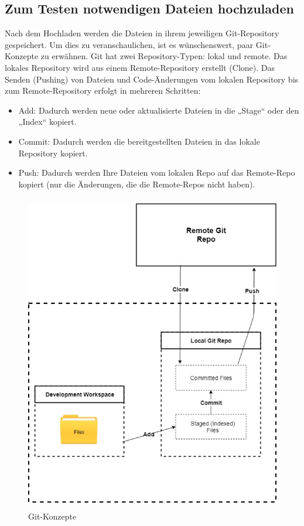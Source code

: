 \documentclass[a4paper,12pt,oneside]{book}
\begin{document}
\subsection{Zum Testen notwendigen Dateien hochzuladen}
Nach dem Hochladen werden die Dateien in ihrem jeweiligen Git-Repository gespeichert. Um dies zu veranschaulichen, ist es wünschenswert, paar Git-Konzepte zu erwähnen.
\newline
Git hat zwei Repository-Typen: lokal und remote. Das lokales Repository wird aus einem Remote-Repository erstellt (Clone). Das Senden (Pushing) von Dateien und Code-Änderungen vom lokalen Repository bis zum Remote-Repository erfolgt in mehreren Schritten: 
\begin{itemize}
	\item Add: Dadurch werden neue oder aktualisierte Dateien in die „Stage“ oder den „Index“ kopiert.
	\item Commit: Dadurch werden die bereitgestellten Dateien in das lokale Repository kopiert.
	\item Push: Dadurch werden Ihre Dateien vom lokalen Repo auf das Remote-Repo kopiert (nur die Änderungen, die die Remote-Repos nicht haben).
\end{itemize}
\begin{figure}[h!]
	\begin{center}
		\includegraphics[width=14cm, height=14cm]{Git-Konzept.jpg}
		\caption{Git-Konzepte} 
		\label{ Git-Konzepte} 
	\end{center}
\end{figure}
\end{document}
